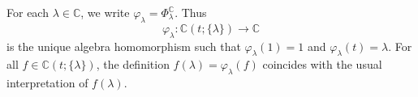 For each $\lambda \in \mathbb{C}$, we write $\varphi_\lambda = \Phi_\lambda^{\mathbb{C}}$. Thus
$$\varphi_\lambda : \mathbb{C}(t; \{\lambda\}) \to \mathbb{C}$$
is the unique algebra homomorphism such that $\varphi_\lambda(1) = 1$ and $\varphi_\lambda(t) = \lambda$. For all $f \in \mathbb{C}(t; \{\lambda\})$, the definition $f(\lambda) = \varphi_\lambda(f)$ coincides with the usual interpretation of $f(\lambda)$.
